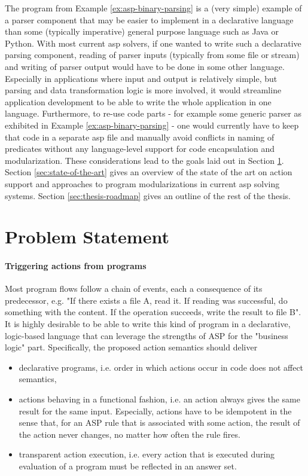 The program from Example \ref{ex:asp-binary-parsing} is a (very simple) example of a parser component that may be easier to implement in a declarative language than some (typically imperative) general purpose language such as Java or Python. With most current \gls{asp} solvers, if one wanted to write such a declarative parsing component, reading of parser inputs (typically from some file or stream) and writing of parser output would have to be done in some other language. Especially in applications where input and output is relatively simple, but parsing and data transformation logic is more involved, it would streamline application development to be able to write the whole application in one language. Furthermore, to re-use code parts - for example some generic parser as exhibited in Example \ref{ex:asp-binary-parsing} - one would currently have to keep that code in a separate \gls{asp} file and manually avoid conflicts in naming of predicates without any language-level support for code encapsulation and modularization. These considerations lead to the goals laid out in Section \ref{sec:problem-statement}. Section \ref{sec:state-of-the-art} gives an overview of the state of the art on action support and approaches to program modularizations in current \gls{asp} solving systems. Section \ref{sec:thesis-roadmap} gives an outline of the rest of the thesis.

\section{Problem Statement}
\label{sec:problem-statement}

\paragraph{Triggering actions from programs} \label{goals:actions}Most program flows follow a chain of events, each a consequence of its predecessor, e.g. "If there exists a file A, read it. If reading was successful, do something with the content. If the operation succeeds, write the result to file B". It is highly desirable to be able to write this kind of program in a declarative, logic-based language that can leverage the strengths of ASP for the "business logic" part. Specifically, the proposed action semantics should deliver
\begin{itemize}
    \item declarative programs, i.e. order in which actions occur in code does not affect semantics,
    \item actions behaving in a functional fashion, i.e. an action always gives the same result for the same input. Especially, actions have to be idempotent in the sense that, for an ASP rule that is associated with some action, the result of the action never changes, no matter how often the rule fires.
    \item transparent action execution, i.e. every action that is executed during evaluation of a program must be reflected in an answer set.
\end{itemize}

